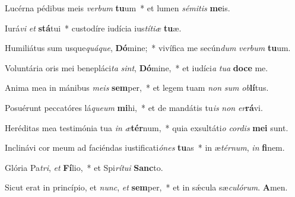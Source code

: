 \item Lucérna pédibus meis \textit{verbum} \textbf{tu}um~* et lumen \textit{sémitis} \textbf{me}is.

\item Iurá\textit{vi} \textit{et} \textbf{stá}tui~* custodíre iudícia ius\textit{títiæ} \textbf{tu}æ.

\item Humiliátus sum usque\textit{quáque}, \textbf{Dó}mine;~* vivífica me secún\textit{dum} \textit{verbum} \textbf{tu}um.

\item Voluntária oris mei benepláci\textit{ta} \textit{sint}, \textbf{Dó}mine,~* et iudíci\textit{a} \textit{tua} \textbf{do}\textbf{ce} me.

\item Anima mea in mánibus \textit{meis} \textbf{sem}per,~* et legem tuam \textit{non} \textit{sum} \textit{ob}\textbf{lí}tus.

\item Posuérunt peccatóres lá\textit{queum} \textbf{mi}hi,~* et de mandátis tu\textit{is} \textit{non} \textit{er}\textbf{rá}vi.

\item Heréditas mea testimónia tua \textit{in} \textit{æ}\textbf{tér}num,~* quia exsultáti\textit{o} \textit{cordis} \textbf{me}\textbf{i} sunt.

\item Inclinávi cor meum ad faciéndas iustificati\textit{ónes} \textbf{tu}as~* in æ\textit{térnum}, \textit{in} \textbf{fi}nem.

\item Glória Pa\textit{tri}, \textit{et} \textbf{Fí}lio,~* et Spi\textit{rítui} \textbf{Sanc}to.

\item Sicut erat in princípio, et \textit{nunc}, \textit{et} \textbf{sem}per,~* et in sǽcula sæ\textit{culórum}. \textbf{A}men.
